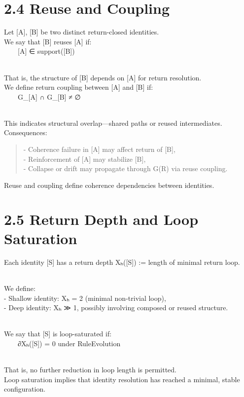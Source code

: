 \section{2.4 \textbar{} Reuse and Coupling}\label{reuse-and-coupling}

Let {[}A{]}, {[}B{]} be two distinct return-closed identities.\\
We say that {[}B{]} reuses {[}A{]} if:\\
  {[}A{]} ∈ support({[}B{]})\\
\strut \\
That is, the structure of {[}B{]} depends on {[}A{]} for return
resolution.\\
We define return coupling between {[}A{]} and {[}B{]} if:\\
  G\_{[}A{]} ∩ G\_{[}B{]} ≠ ∅\\
\strut \\
This indicates structural overlap---shared paths or reused
intermediates.\\
Consequences:

\begin{quote}
- Coherence failure in {[}A{]} may affect return of {[}B{]},\\
- Reinforcement of {[}A{]} may stabilize {[}B{]},\\
- Collapse or drift may propagate through G(R) via reuse coupling.
\end{quote}

Reuse and coupling define coherence dependencies between identities.

\section{2.5 \textbar{} Return Depth and Loop
Saturation}\label{return-depth-and-loop-saturation}

Each identity {[}S{]} has a return depth Xₕ({[}S{]}) := length of
minimal return loop.\\
\strut \\
We define:\\
- Shallow identity: Xₕ = 2 (minimal non-trivial loop),\\
- Deep identity: Xₕ ≫ 1, possibly involving composed or reused
structure.\\
\strut \\
We say that {[}S{]} is loop-saturated if:\\
  ∂Xₕ({[}S{]}) = 0 under RuleEvolution\\
\strut \\
That is, no further reduction in loop length is permitted.\\
Loop saturation implies that identity resolution has reached a minimal,
stable configuration.

